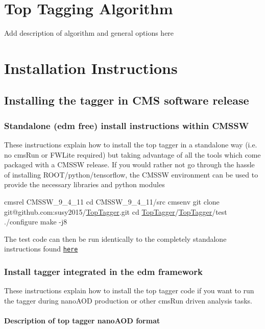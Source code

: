 \section*{Top Tagging Algorithm}

Add description of algorithm and general options here

\section*{Installation Instructions}

\subsection*{Installing the tagger in C\-M\-S software release}

\subsubsection*{Standalone (edm free) install instructions within C\-M\-S\-S\-W}

These instructions explain how to install the top tagger in a standalone way (i.\-e. no cms\-Run or F\-W\-Lite required) but taking advantage of all the tools which come packaged with a C\-M\-S\-S\-W release. If you would rather not go through the hassle of installing R\-O\-O\-T/python/tensorflow, the C\-M\-S\-S\-W environment can be used to provide the necessary libraries and python modules


\begin{DoxyCode}
cmsrel CMSSW\_9\_4\_11
cd CMSSW\_9\_4\_11/src
cmsenv
git clone git@github.com:susy2015/\hyperlink{classTopTagger}{TopTagger}.git
cd \hyperlink{classTopTagger}{TopTagger}/\hyperlink{classTopTagger}{TopTagger}/test
./configure
make -j8 
\end{DoxyCode}


The test code can then be run identically to the completely standalone instructions found \href{../README.md#running-the-example}{\tt here}

\subsubsection*{Install tagger integrated in the edm framework}

These instructions explain how to install the top tagger code if you want to run the tagger during nano\-A\-O\-D production or other cms\-Run driven analysis tasks.

\paragraph*{Description of top tagger nano\-A\-O\-D format}

